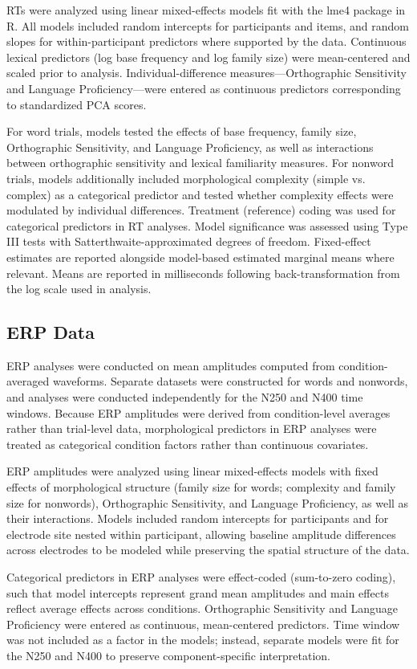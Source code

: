 \documentclass[utf8]{FrontiersinHarvard} %
\begin{document}
RTs were analyzed using linear mixed-effects models fit with the lme4 package in R. All models included random intercepts for participants and items, and random slopes for within-participant predictors where supported by the data. Continuous lexical predictors (log base frequency and log family size) were mean-centered and scaled prior to analysis. Individual-difference measures—Orthographic Sensitivity and Language Proficiency—were entered as continuous predictors corresponding to standardized PCA scores.

For word trials, models tested the effects of base frequency, family size, Orthographic Sensitivity, and Language Proficiency, as well as interactions between orthographic sensitivity and lexical familiarity measures. For nonword trials, models additionally included morphological complexity (simple vs. complex) as a categorical predictor and tested whether complexity effects were modulated by individual differences. Treatment (reference) coding was used for categorical predictors in RT analyses. Model significance was assessed using Type III tests with Satterthwaite-approximated degrees of freedom. Fixed-effect estimates are reported alongside model-based estimated marginal means where relevant. Means are reported in milliseconds following back-transformation from the log scale used in analysis.

\subsection{ERP Data}
ERP analyses were conducted on mean amplitudes computed from condition-averaged waveforms. Separate datasets were constructed for words and nonwords, and analyses were conducted independently for the N250 and N400 time windows. Because ERP amplitudes were derived from condition-level averages rather than trial-level data, morphological predictors in ERP analyses were treated as categorical condition factors rather than continuous covariates.

ERP amplitudes were analyzed using linear mixed-effects models with fixed effects of morphological structure (family size for words; complexity and family size for nonwords), Orthographic Sensitivity, and Language Proficiency, as well as their interactions. Models included random intercepts for participants and for electrode site nested within participant, allowing baseline amplitude differences across electrodes to be modeled while preserving the spatial structure of the data.

Categorical predictors in ERP analyses were effect-coded (sum-to-zero coding), such that model intercepts represent grand mean amplitudes and main effects reflect average effects across conditions. Orthographic Sensitivity and Language Proficiency were entered as continuous, mean-centered predictors. Time window was not included as a factor in the models; instead, separate models were fit for the N250 and N400 to preserve component-specific interpretation.
\end{document}
